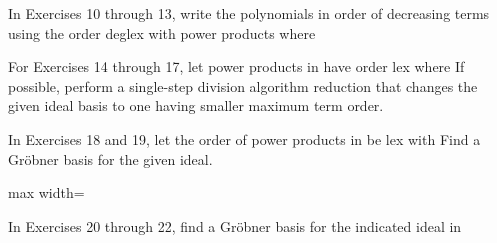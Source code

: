 \documentclass[11pt,oneside]{article}
\begin{document}
\begin{BookBody}
\noindent In Exercises 10 through 13, write the polynomials in order of decreasing terms using the order deglex with power products  where 





\noindent For Exercises 14 through 17, let power products in  have order lex where  If possible, perform a single-step division algorithm reduction that changes the given ideal basis to one having smaller maximum term order.





\noindent In Exercises 18 and 19, let the order of power products in  be lex with  Find a Gröbner basis for the given ideal.

\begin{center}\begin{adjustbox}{max width=\linewidth}\end{adjustbox}\end{center}


\noindent In Exercises 20 through 22, find a Gröbner basis for the indicated ideal in 



\end{BookBody}
\end{document}
